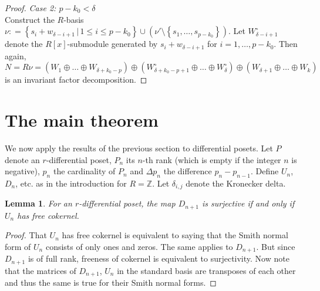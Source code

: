 \documentclass[11pt]{article}
\newtheorem{lemma}[theo]{Lemma}
\theoremstyle{definition}
\numberwithin{equation}{section}
\newcommand{\ZZ}{\mathbb{Z}}
\begin{document}
\begin{proof}
\textit{Case 2: $p-k_{0} < \delta $}\\

Construct the $ R$-basis $ \nu : =  \left \{  s_{i} + w_{\delta - i + 1   }  \, | \, 1 \leq i \leq   p - k_{0}    \right \}     \cup ( \nu' \setminus \left \{  s_{1}, \ldots, s_{ p - k_{0}}   \right \}   )   $.  Let $ W_{\delta - i  + 1 }^{\circ} $ denote the $ R[x]$-submodule generated by $ s_{i} + w_{\delta - i + 1 }  $ for $ i = 1, \ldots, p -  k_{0} $. Then again, 
$$ N = R \nu = \left (  W_{1} \oplus \ldots \oplus W_{ \delta  + k _{0 } - p } \right )  \oplus  \left (  W_{ \delta  + k_{0}  - p %
   + 1 }^{\circ}   \oplus \ldots \oplus  W_{\delta } ^\circ \right )    \oplus \left (   W_{\delta+1} \oplus  \ldots \oplus  W_{k}  \right )    $$  
is an invariant factor decomposition.    
 \end{proof} 





\section{The main theorem}    
We now apply the results of the previous section to differential posets. Let $  P $ denote an $ r $-differential poset, $ P_{n} $ its $ n $-th rank (which is empty if the integer  $ n $ is negative),  $ p_{n} $ the cardinality of $ P_{n} $ and $ \Delta p_{n} $ the difference  $  p_{n} - p_{n-1} $. Define $U_{n}$, $D_{n}$, etc. as in the  introduction  for  $ R = \ZZ $. Let $ \delta_{i,j} $ denote the Kronecker delta.     

\begin{lemma}       \label{freecokernel}                For  an  $ r $-differential poset, the map $ D_{n+1} $ is surjective    if and only if $ U_{n}   $ has free cokernel.                          
\end{lemma}      


\begin{proof} That $ U_{n} $ has free cokernel is equivalent to saying that the Smith normal form of $ U_{n} $ consists of only ones and  zeros.  The same applies to $ D_{n+1} $. But since $ D_{n+1} $ is of full rank, freeness of cokernel is equivalent to  surjectivity. Now note that the matrices of  $ D_{n+1} $, $ U_{n} $ in the standard basis are transposes  of each other and thus the same is true for their Smith normal forms. 
\end{proof}          
\end{document}
